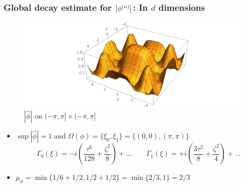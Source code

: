 \documentclass{beamer}
\theoremstyle{definition}
\begin{document}
\begin{frame}
\frametitle{Global decay estimate for $\abs{\phi^{(n)}}$: In $d$ dimensions}

\begin{figure}
\vspace{-10pt}
\centering
\includegraphics[scale=0.4]{d_dim_ex_2}
\caption{$|\widehat{\phi}|$ on $(-\pi, \pi] \times (-\pi, \pi]$}
\end{figure}
\begin{itemize}
\item $\sup|\widehat{\phi}| = 1$ and $\Omega(\phi)= \{\xi_0,\xi_1 \}  = \{ (0,0), (\pi,\pi) \} $
\begin{equation*}
\Gamma_{0}(\xi)=-i\left(\frac{\tau^6}{128}+\frac{\zeta^2}{8}\right) + \dots \qquad \Gamma_{1}(\xi)= +i\left(\frac{3\tau^2}{8}+\frac{\zeta^2}{4}\right) + \dots
\end{equation*}

\item $\mu_\phi = \min\{1/6+1/2, 1/2+1/2\} = \min\{2/3,1\}=  2/3$
\end{itemize}
\end{frame}
\end{document}
